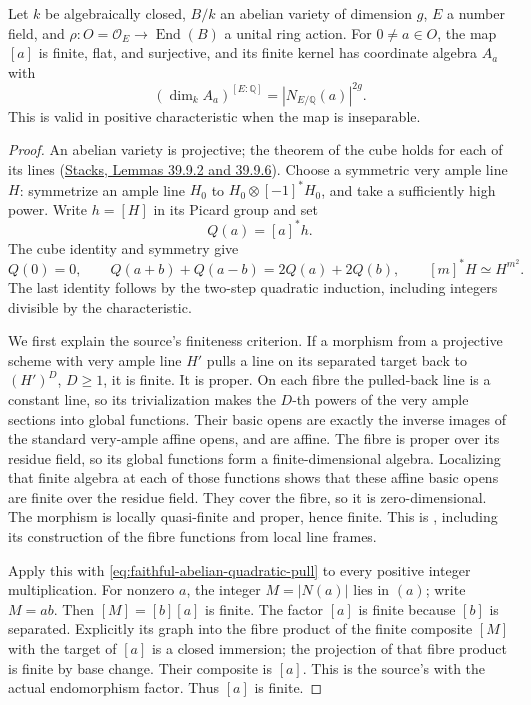 \begin{srproposition}
\label{prop:faithful-proper-multiplication-degree}
Let \(k\) be algebraically closed, \(B/k\) an abelian variety
of dimension \(g\), \(E\) a number field, and
\(\rho:O=\mathcal O_E\to\operatorname{End}(B)\) a unital ring
action.
For \(0\ne a\in O\), the map \([a]\) is finite, flat, and
surjective, and its finite kernel has coordinate algebra
\(A_a\) with
\[
                    (\dim_kA_a)^{[E:\mathbb Q]}
                             =|N_{E/\mathbb Q}(a)|^{2g}.
 \tag{DG6}\label{eq:faithful-proper-multiplication-norm-degree}
\]
This is valid in positive characteristic when the map is
inseparable.
\end{srproposition}
\begin{proof}
An abelian variety is projective; the theorem of the cube
holds for each of its lines
(\href{https://stacks.math.columbia.edu/tag/0BF9}{Stacks,
Lemmas 39.9.2 and 39.9.6}).
Choose a symmetric very ample line \(H\): symmetrize an
ample line \(H_0\) to \(H_0\otimes[-1]^*H_0\), and
take a sufficiently high power.
Write \(h=[H]\) in its Picard group and set
\[
                         Q(a)=[a]^*h .
\]
The cube identity and symmetry give
\[
 Q(0)=0,\qquad Q(a+b)+Q(a-b)=2Q(a)+2Q(b),\qquad
                         [m]^*H\simeq H^{m^2}.
 \tag{DG7}\label{eq:faithful-abelian-quadratic-pull}
\]
The last identity follows by the two-step quadratic induction,
including integers divisible by the characteristic.

We first explain the source's finiteness criterion.
If a morphism from a projective scheme with very ample line
\(H'\) pulls a line on its separated target back to
\((H')^D\), \(D\ge1\), it is finite.
It is proper.  On each fibre the pulled-back line is a
constant line, so its trivialization makes the \(D\)-th
powers of the very ample sections into global functions.
Their basic opens are exactly the inverse images of the
standard very-ample affine opens, and are affine.
The fibre is proper over its residue field, so its global
functions form a finite-dimensional algebra.
Localizing that finite algebra at each of those functions
shows that these affine basic opens are finite over the
residue field.  They cover the fibre, so it is zero-dimensional.
The morphism is locally quasi-finite and proper, hence finite.
This is , including its
construction of the fibre functions from local line frames.

Apply this with \eqref{eq:faithful-abelian-quadratic-pull}
to every positive integer multiplication.
For nonzero \(a\), the integer \(M=|N(a)|\) lies in \((a)\);
write \(M=ab\).
Then \([M]=[b][a]\) is finite.
The factor \([a]\) is finite because \([b]\) is separated.
Explicitly its graph into the fibre product of the finite
composite \([M]\) with the target of \([a]\) is a closed
immersion; the projection of that fibre product is finite
by base change.  Their composite is \([a]\).
This is the source's  with the
actual endomorphism factor.
Thus \([a]\) is finite.


\end{proof}
